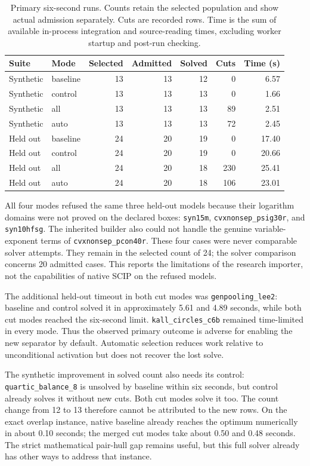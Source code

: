 \begin{table}[ht]
\centering
\small
\begin{tabular}{llrrrrr}
\toprule
Suite & Mode & Selected & Admitted & Solved & Cuts & Time (s)\\
\midrule
Synthetic & baseline & 13 & 13 & 12 & 0 & 6.57\\
Synthetic & control  & 13 & 13 & 13 & 0 & 1.66\\
Synthetic & all      & 13 & 13 & 13 & 89 & 2.51\\
Synthetic & auto     & 13 & 13 & 13 & 72 & 2.45\\
\midrule
Held out & baseline & 24 & 20 & 19 & 0 & 17.40\\
Held out & control  & 24 & 20 & 19 & 0 & 20.66\\
Held out & all      & 24 & 20 & 18 & 230 & 25.41\\
Held out & auto     & 24 & 20 & 18 & 106 & 23.01\\
\bottomrule
\end{tabular}
\caption{Primary six-second runs. Counts retain the selected population
and show actual admission separately. Cuts are recorded rows. Time is
the sum of available in-process integration and source-reading times,
excluding worker startup and post-run checking.}
\label{tab:primary}
\end{table}

All four modes refused the same three held-out models because their
logarithm domains were not proved on the declared boxes:
\texttt{syn15m}, \texttt{cvxnonsep\_psig30r}, and
\texttt{syn10hfsg}. The inherited builder also could not handle the
genuine variable-exponent terms of \texttt{cvxnonsep\_pcon40r}.
These four cases were never comparable solver attempts. They remain
in the selected count of 24; the solver comparison concerns 20
admitted cases. This reports the limitations of the research importer,
not the capabilities of native SCIP on the refused models.

The additional held-out timeout in both cut modes was
\texttt{genpooling\_lee2}: baseline and control solved it in
approximately 5.61 and 4.89 seconds, while both cut modes reached
the six-second limit. \texttt{kall\_circles\_c6b} remained
time-limited in every mode. Thus the observed primary outcome is
adverse for enabling the new separator by default. Automatic selection
reduces work relative to unconditional activation but does not recover
the lost solve.

The synthetic improvement in solved count also needs its control:
\texttt{quartic\_balance\_8} is unsolved by baseline within six
seconds, but control already solves it without new cuts. Both cut
modes solve it too. The count change from 12 to 13 therefore cannot
be attributed to the new rows. On the exact overlap instance, native
baseline already reaches the optimum numerically in about 0.10
seconds; the merged cut modes take about 0.50 and 0.48 seconds.
The strict mathematical pair-hull gap remains useful, but this full
solver already has other ways to address that instance.

